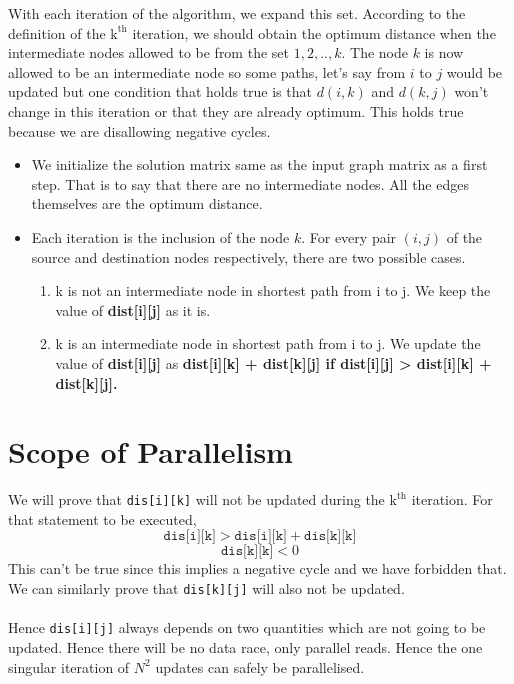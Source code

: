 \documentclass{article}
\begin{document}
With each iteration of the algorithm, we expand this set. According to the definition of the $\mathrm{k}^{\mathrm{th}}$ iteration, we should obtain the optimum distance when the intermediate nodes allowed to be from the set ${1, 2, .., k}$. The node $k$ is now allowed to be an intermediate node so some paths, let's say from $i$ to $j$ would be updated but one condition that holds true is that $d(i, k)$ and $d(k, j)$ won't change in this iteration or that they are already optimum. This holds true because we are disallowing negative cycles.

\begin{itemize}
    \item We initialize the solution matrix same as the input graph matrix as a first step. That is to say that there are no intermediate nodes. All the edges themselves are the optimum distance.
    \item Each iteration is the inclusion of the node $k$. For every pair $(i, j)$ of the source and destination nodes respectively, there are two possible cases.
    \begin{enumerate}
        \item k is not an intermediate node in shortest path from i to j. We keep the value of \textbf{dist[i][j]} as it is.
        \item k is an intermediate node in shortest path from i to j. We update the value of \textbf{dist[i][j]} as \textbf{dist[i][k] + dist[k][j] if dist[i][j] > dist[i][k] + dist[k][j].}
    \end{enumerate}
\end{itemize}

\section{Scope of Parallelism}
We will prove that \texttt{dis[i][k]} will not be updated during the $\mathrm{k}^{\mathrm{th}}$ iteration. For that statement to be executed,
$$\texttt{dis[i][k]} > \texttt{dis[i][k]}+\texttt{dis[k][k]}$$
$$\texttt{dis[k][k]} < 0$$
This can't be true since this implies a negative cycle and we have forbidden that. We can similarly prove that \texttt{dis[k][j]} will also not be updated. \\ \\
Hence \texttt{dis[i][j]} always depends on two quantities which are not going to be updated. Hence there will be no data race, only parallel reads. Hence the one singular iteration of $N^2$ updates can safely be parallelised.
\end{document}
